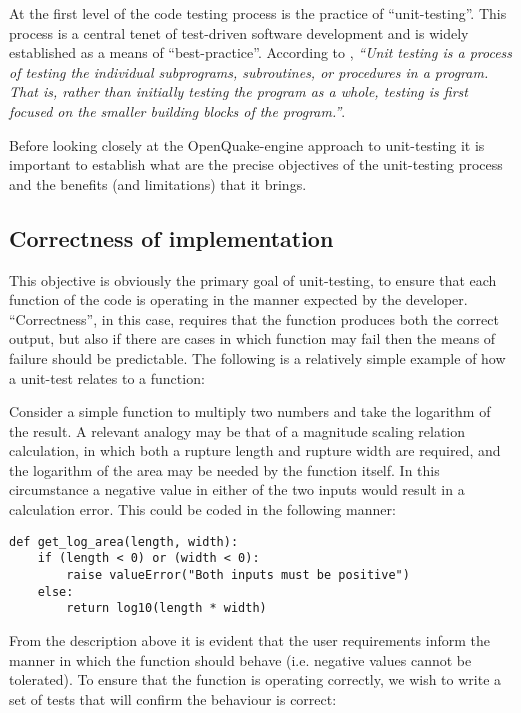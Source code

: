 At the first level of the code testing process is the practice of ``unit-testing''. This process is a central tenet of test-driven software development and is widely established as a means of ``best-practice''. According to \citet{myers2012}, \emph{``Unit testing is a process of testing the individual subprograms, subroutines, or procedures in a program. That is, rather than initially testing the program as a whole, testing is first focused on the smaller building blocks of the program.''}.

Before looking closely at the OpenQuake-engine approach to unit-testing it is important to establish what are the precise objectives of the unit-testing process and the benefits (and limitations) that it brings.

\subsection{Correctness of implementation}
This objective is obviously the primary goal of unit-testing, to ensure that each function of the code is operating in the manner expected by the developer. ``Correctness'', in this case, requires that the function produces both the correct output, but also if there are cases in which function may fail then the means of failure should be predictable. The following is a relatively simple example of how a unit-test relates to a function:

Consider a simple function to multiply two numbers and take the logarithm of the result. A relevant analogy may be that of a magnitude scaling relation calculation, in which both a rupture length and rupture width are required, and the logarithm of the area may be needed by the function itself. In this circumstance a negative value in either of the two inputs would result in a calculation error. This could be coded in the following manner:

\begin{lstlisting}[frame=single]
def get_log_area(length, width):
    if (length < 0) or (width < 0):
        raise valueError("Both inputs must be positive")
    else:
        return log10(length * width)
\end{lstlisting}

From the description above it is evident that the user requirements inform the manner in which the function should behave (i.e. negative
values cannot be tolerated). To ensure that the function is operating correctly, we wish to write a set of tests that will confirm the behaviour is correct:

